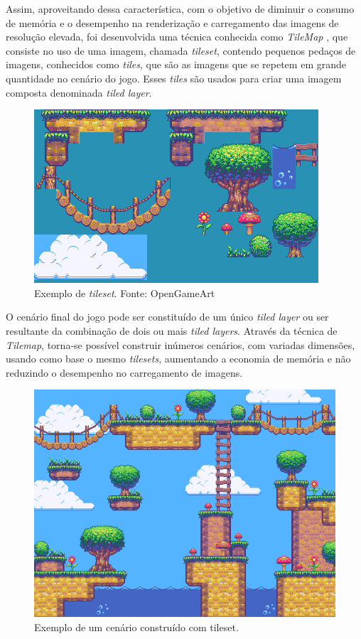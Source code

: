 Assim, aproveitando dessa característica, com o objetivo de diminuir o consumo de memória e o desempenho na renderização e carregamento das imagens de resolução elevada, foi desenvolvida uma técnica conhecida como \textit{TileMap} \cite{Novak}, que consiste no uso de uma imagem, chamada \textit{tileset}, contendo pequenos pedaços de imagens, conhecidos como \textit{tiles}, que são as imagens que se repetem em grande quantidade no cenário do jogo. Esses \textit{tiles} são usados para criar uma imagem composta denominada \textit{tiled layer}.
%
%
\begin{figure}[H]
    \centering
		\caption{Exemplo de \textit{tileset}. Fonte: OpenGameArt}
    \label{tileset_edit}
    \includegraphics[scale = 1.0]{Imagens/tileset_edit.png}
\end{figure}
%
\par
O cenário final do jogo pode ser constituído de um único \textit{tiled layer} ou ser resultante da combinação de dois ou mais \textit{tiled layers}. Através da técnica de \textit{Tilemap}, torna-se possível construir inúmeros cenários, com variadas dimensões, usando como base o mesmo \textit{tilesets}, aumentando a economia de memória e não reduzindo o desempenho no carregamento de imagens.
%
%
%
\begin{figure}[H]
    \centering
		\caption{Exemplo de um cenário construído com tileset.}
    \label{cenario}
    \includegraphics[scale = 0.65]{Imagens/cenario.png}
\end{figure}
